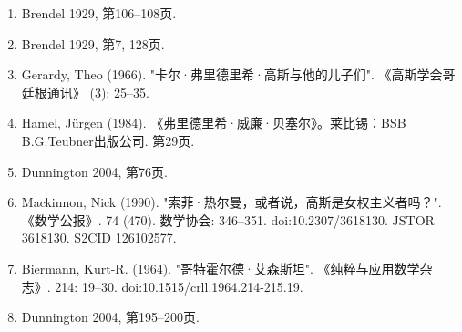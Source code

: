\begin{enumerate}
\item Brendel 1929, 第106–108页.  
\item Brendel 1929, 第7, 128页.  
\item Gerardy, Theo (1966). "卡尔·弗里德里希·高斯与他的儿子们". 《高斯学会哥廷根通讯》 (3): 25–35.  
\item Hamel, Jürgen (1984). 《弗里德里希·威廉·贝塞尔》。莱比锡：BSB B.G.Teubner出版公司. 第29页.  
\item Dunnington 2004, 第76页.  
\item Mackinnon, Nick (1990). "索菲·热尔曼，或者说，高斯是女权主义者吗？". 《数学公报》. 74 (470). 数学协会: 346–351. doi:10.2307/3618130. JSTOR 3618130. S2CID 126102577.  
\item Biermann, Kurt-R. (1964). "哥特霍尔德·艾森斯坦". 《纯粹与应用数学杂志》. 214: 19–30. doi:10.1515/crll.1964.214-215.19.  
\item Dunnington 2004, 第195–200页.


\end{enumerate}
